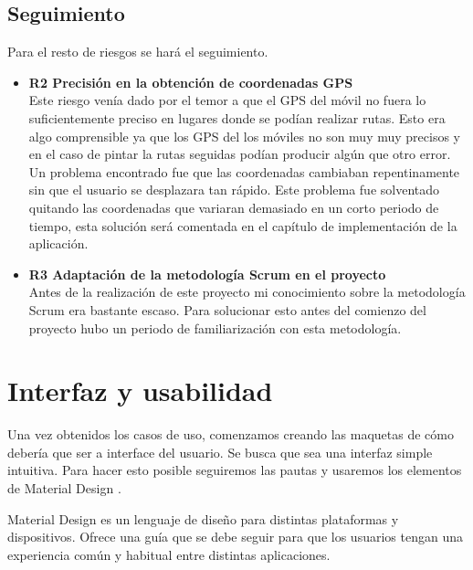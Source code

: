 \subsection{Seguimiento} 	
	Para el resto de riesgos se hará el seguimiento.
	\begin{itemize}
	\item\textbf{ R2 Precisión en la obtención de coordenadas GPS}\\
	Este riesgo venía dado por el temor a que el GPS del móvil no fuera lo suficientemente preciso en  lugares donde se podían realizar rutas. Esto era algo comprensible ya que los GPS del los móviles no son muy muy precisos y en el caso de pintar la rutas seguidas podían producir algún que otro error. Un problema encontrado fue que las coordenadas cambiaban repentinamente sin que el usuario se desplazara tan rápido. Este problema fue solventado quitando las coordenadas que variaran demasiado en un corto periodo de tiempo, esta solución será comentada en el capítulo de implementación de la aplicación.


\item \textbf{R3 Adaptación de la metodología Scrum en el proyecto}\\
Antes de la realización de este proyecto mi conocimiento sobre la metodología Scrum era bastante escaso. Para solucionar esto antes del comienzo del proyecto hubo un periodo de familiarización con esta metodología. 

	\end{itemize}
\newpage
\section{Interfaz y usabilidad}
Una vez obtenidos los casos de uso, comenzamos creando las maquetas de cómo debería que ser a interface del usuario.
Se busca que sea una interfaz simple  intuitiva.
Para hacer esto posible seguiremos las pautas y usaremos los elementos de Material Design \cite{1}. 


Material Design es un lenguaje de diseño para distintas plataformas y dispositivos. Ofrece una guía que se debe seguir para que los usuarios  tengan una experiencia común y habitual entre distintas aplicaciones.


	
	
